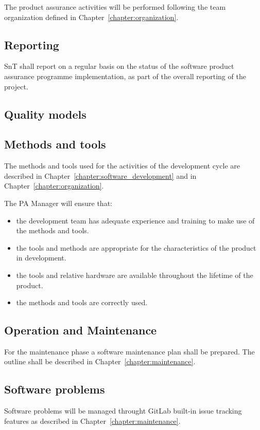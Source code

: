 The product assurance activities will be performed following the team organization defined in Chapter~\ref{chapter:organization}.

\subsection{Reporting}
SnT shall report on a regular basis on the status of the software product assurance programme implementation, as part of the overall reporting of the project.

\subsection{Quality models}

\subsection{Methods and tools}

The methods and tools used for the activities of the development cycle are described in Chapter~\ref{chapter:software_development} and in Chapter~\ref{chapter:organization}.

The PA Manager will ensure that:
\begin{itemize}
  \item the development team has adequate experience and training to make use of  the methods and tools.
  \item the tools and methods are appropriate for the characteristics of the product in development.
  \item the tools and relative hardware are available throughout the lifetime of the product.
  \item the methods and tools are correctly used.
\end{itemize}


\subsection{Operation and Maintenance}
For the maintenance phase a software maintenance plan shall be prepared.
The outline shall be described in Chapter~\ref{chapter:maintenance}.

\subsection{Software problems}

Software problems will be managed throught GitLab built-in issue tracking features as described in Chapter~\ref{chapter:maintenance}.
